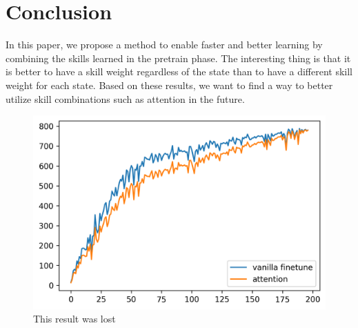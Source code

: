 \section{Conclusion}


In this paper, we propose a method to enable faster and better learning by combining the skills learned in the pretrain phase.
The interesting thing is that it is better to have a skill weight regardless of the state than to have a different skill weight for each state.
Based on these results, we want to find a way to better utilize skill combinations such as attention in the future.



\begin{figure}[hb]
  \vskip 0.2in
  \begin{center}
  \centerline{\includegraphics[width=\columnwidth]{Figures/attention_on_walker_run.png}}
  \caption{This result was lost}
  \label{attention-on-walker-run}
  \end{center}
  \vskip -0.2in
  \end{figure}